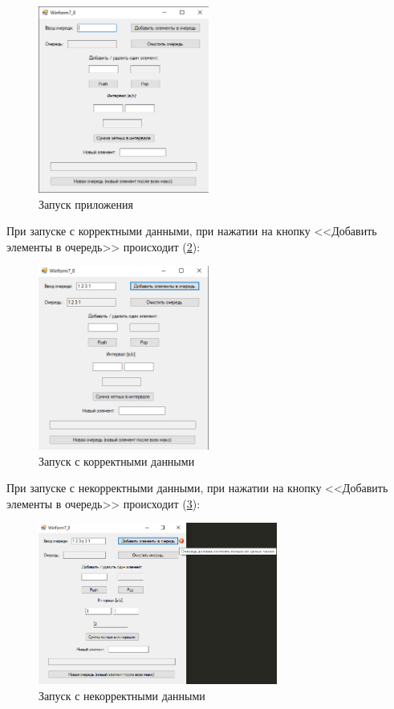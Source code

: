 \begin{figure}[!h]
    \centering
    \includegraphics[width = 0.5\textwidth]{images/Task7/Start.png}
    \caption{Запуск приложения}
    \label{fig:StartForm7}
\end{figure}

При запуске с корректными данными, при нажатии на кнопку <<Добавить элементы в очередь>> происходит (\ref{fig:WorkForm7}):

\newpage

\begin{figure}[!h]
    \centering
    \includegraphics[width = 0.5\textwidth]{images/Task7/WorkAddQueue.png}
    \caption{Запуск с корректными данными}
    \label{fig:WorkForm7}
\end{figure}

При запуске с некорректными данными, при нажатии на кнопку <<Добавить элементы в очередь>> происходит  (\ref{fig:BadInputNotIntForm7}):

\begin{figure}[!h]
    \centering
    \includegraphics[width = 0.7\textwidth]{images/Task7/BadInputAddNotInt.png}
    \caption{Запуск с некорректными данными}
    \label{fig:BadInputNotIntForm7}
\end{figure}

